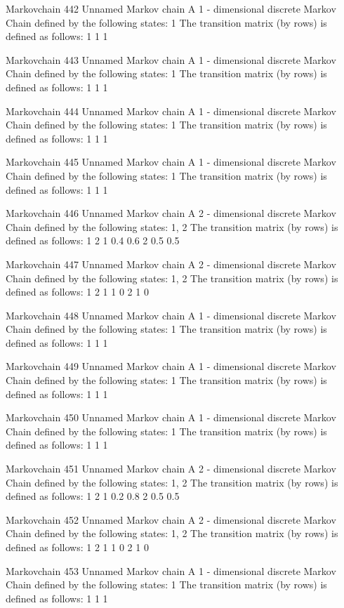 \documentclass[
  nojss]{jss}
\begin{document}
\begin{CodeChunk}
\begin{CodeOutput}
Markovchain  442 
Unnamed Markov chain 
 A  1 - dimensional discrete Markov Chain defined by the following states: 
 1 
 The transition matrix  (by rows)  is defined as follows: 
  1
1 1

Markovchain  443 
Unnamed Markov chain 
 A  1 - dimensional discrete Markov Chain defined by the following states: 
 1 
 The transition matrix  (by rows)  is defined as follows: 
  1
1 1

Markovchain  444 
Unnamed Markov chain 
 A  1 - dimensional discrete Markov Chain defined by the following states: 
 1 
 The transition matrix  (by rows)  is defined as follows: 
  1
1 1

Markovchain  445 
Unnamed Markov chain 
 A  1 - dimensional discrete Markov Chain defined by the following states: 
 1 
 The transition matrix  (by rows)  is defined as follows: 
  1
1 1

Markovchain  446 
Unnamed Markov chain 
 A  2 - dimensional discrete Markov Chain defined by the following states: 
 1, 2 
 The transition matrix  (by rows)  is defined as follows: 
    1   2
1 0.4 0.6
2 0.5 0.5

Markovchain  447 
Unnamed Markov chain 
 A  2 - dimensional discrete Markov Chain defined by the following states: 
 1, 2 
 The transition matrix  (by rows)  is defined as follows: 
  1 2
1 1 0
2 1 0

Markovchain  448 
Unnamed Markov chain 
 A  1 - dimensional discrete Markov Chain defined by the following states: 
 1 
 The transition matrix  (by rows)  is defined as follows: 
  1
1 1

Markovchain  449 
Unnamed Markov chain 
 A  1 - dimensional discrete Markov Chain defined by the following states: 
 1 
 The transition matrix  (by rows)  is defined as follows: 
  1
1 1

Markovchain  450 
Unnamed Markov chain 
 A  1 - dimensional discrete Markov Chain defined by the following states: 
 1 
 The transition matrix  (by rows)  is defined as follows: 
  1
1 1

Markovchain  451 
Unnamed Markov chain 
 A  2 - dimensional discrete Markov Chain defined by the following states: 
 1, 2 
 The transition matrix  (by rows)  is defined as follows: 
    1   2
1 0.2 0.8
2 0.5 0.5

Markovchain  452 
Unnamed Markov chain 
 A  2 - dimensional discrete Markov Chain defined by the following states: 
 1, 2 
 The transition matrix  (by rows)  is defined as follows: 
  1 2
1 1 0
2 1 0

Markovchain  453 
Unnamed Markov chain 
 A  1 - dimensional discrete Markov Chain defined by the following states: 
 1 
 The transition matrix  (by rows)  is defined as follows: 
  1
1 1


\end{CodeOutput}
\end{CodeChunk}
\end{document}

